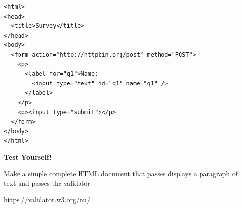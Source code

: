 \begin{frame}[fragile]
\small
\begin{verbatim}
<html>
<head>
  <title>Survey</title>
</head>
<body>
  <form action="http://httpbin.org/post" method="POST">
    <p>
      <label for="q1">Name: 
        <input type="text" id="q1" name="q1" />
      </label>
    </p>
    <p><input type="submit"></p>
  </form>
</body>
</html>
\end{verbatim}
\end{frame}






\bgroup
{}
\begin{frame}[plain]{}
\begin{center}
\textbf{{\Large Test Yourself!}}

\vspace{2em}

Make a simple complete HTML document that passes displays a paragraph of text and passes the validator

\vspace{2em}

\url{https://validator.w3.org/nu/}
\end{center}
\end{frame}
\egroup





